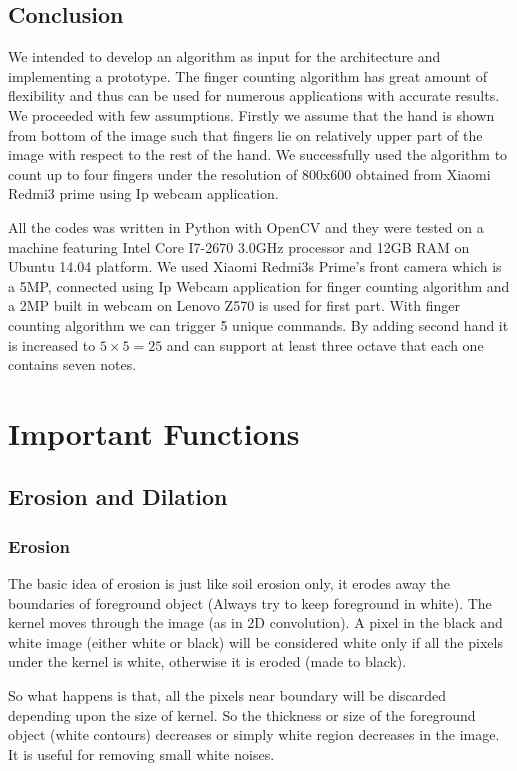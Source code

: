 \section{Conclusion}
We intended to develop an algorithm as input for the architecture and implementing a prototype. The finger counting algorithm has great amount of flexibility and thus can be used for numerous applications with accurate results. \newline We proceeded with few assumptions. Firstly we assume that the hand is shown from bottom of
the image such that fingers lie on relatively upper part of the image with respect to the rest of the
hand.
We successfully used the algorithm to count up to four fingers under the resolution of 800x600 obtained from Xiaomi Redmi3 prime using Ip webcam application. 

All the codes was written in Python with OpenCV and they were tested on a
machine featuring Intel Core I7-2670 3.0GHz processor and 12GB RAM on Ubuntu 14.04
platform. We used Xiaomi Redmi3s Prime's front camera which is a 5MP, connected using Ip Webcam application for finger counting algorithm and a 2MP built in webcam on Lenovo Z570 is used for first part.
With finger counting algorithm we can trigger 5 unique commands. By adding second hand it is increased to $5 \times 5 = 25 $ and can support at least three octave that each one contains seven notes.


\chapter{Important Functions}
\section{Erosion and Dilation}
\subsection{Erosion} \label{ssec:erosion}
The basic idea of erosion is just like soil erosion only, it erodes away the boundaries of foreground object (Always try to keep foreground in white). The kernel moves through the image (as in 2D convolution). A pixel in the black and white image (either white or black) will be considered white only if all the pixels under the kernel is white, otherwise it is eroded (made to black). \newline

So what happens is that, all the pixels near boundary will be discarded depending upon the size of kernel. So the thickness or size of the foreground object (white contours) decreases or simply white region decreases in the image. It is useful for removing small white noises.
